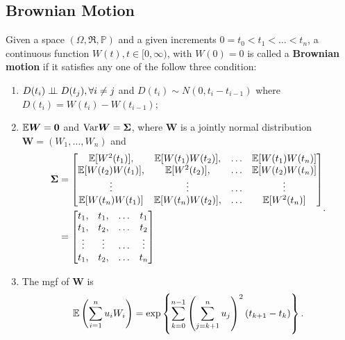 \subsection{Brownian Motion}
\begin{definition}\label{Definition:Brownian_motion}
Given a space $(\Omega,\mathfrak{R},\mathbb{P})$ and a given increments $0=t_0<t_1<\dots<t_n$, a continuous function $W(t),t\in[0,\infty)$, with $W(0)=0$ is called a \textbf{Brownian motion} if it satisfies any one of the follow three condition:
\begin{enumerate}
\item $D(t_i)\perp\!\!\!\perp D(t_j),\forall i\ne j$ and $D(t_i)\sim N(0,t_i-t_{i-1})$ where $D(t_i)=W(t_i)-W(t_{i-1})$;
\item $\mathbb{E} \boldsymbol{W} = \boldsymbol{0}$ and $\text{Var} \boldsymbol{W}=\boldsymbol{\Sigma}$, where $\boldsymbol{W}$ is a jointly normal distribution $\boldsymbol{W}=(W_1,\dots,W_n)$ and
\begin{equation}
\begin{aligned}
\boldsymbol{\Sigma}&=
\begin{bmatrix}
\mathbb{E} [W^2(t_1)], & \mathbb{E}[W(t_1)W(t_2)],&\dots &\mathbb{E}[W(t_1)W(t_n)]\\
\mathbb{E}[W(t_2)W(t_1)], &\mathbb{E} [W^2(t_2)], &\dots&\mathbb{E}[W(t_2)W(t_n)]\\
\vdots &\vdots &\dots & \vdots\\
\mathbb{E} [W(t_n)W(t_1)] &\mathbb{E}[W(t_n)W(t_2)], &\dots & \mathbb{E}[W^2(t_n)]
\end{bmatrix}\\
&=
\begin{bmatrix}
t_1, & t_1, &\dots & t_1\\
t_1, & t_2, &\dots & t_2\\
\vdots & \vdots & \dots & \vdots\\
t_1, & t_2, &\dots & t_n
\end{bmatrix}
\label{eq:brownian_cov_matrix}
\end{aligned}.
\end{equation}
\item The mgf of $\boldsymbol{W}$ is
\begin{equation}
\mathbb{E} \left(\sum_{i=1}^nu_iW_i\right)=\exp\left\{\sum_{k=0}^{n-1}\left(\sum_{j=k+1}^nu_j\right)^2(t_{k+1}-t_{k})\right\}.
\end{equation}
\end{enumerate}
\end{definition}

